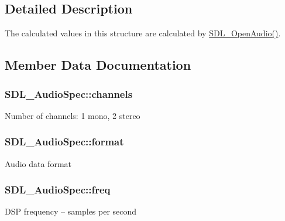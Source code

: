 \subsection{Detailed Description}
The calculated values in this structure are calculated by \hyperlink{_s_d_l__audio_8h_a2edf30e7747584e28041b4986f89f440}{S\+D\+L\+\_\+\+Open\+Audio()}. 

\subsection{Member Data Documentation}
\hypertarget{struct_s_d_l___audio_spec_a31fe8b3710cf23bbef24be8a1749fe46}{}
\subsubsection[{channels}]{ S\+D\+L\+\_\+\+Audio\+Spec\+::channels}\label{struct_s_d_l___audio_spec_a31fe8b3710cf23bbef24be8a1749fe46}
Number of channels\+: 1 mono, 2 stereo \hypertarget{struct_s_d_l___audio_spec_ae37c634cac5807762f184c8d5d49fc2d}{}
\subsubsection[{format}]{ S\+D\+L\+\_\+\+Audio\+Spec\+::format}\label{struct_s_d_l___audio_spec_ae37c634cac5807762f184c8d5d49fc2d}
Audio data format \hypertarget{struct_s_d_l___audio_spec_a8b823ce46fc2e448cf7e6fc141aff6b2}{}
\subsubsection[{freq}]{ S\+D\+L\+\_\+\+Audio\+Spec\+::freq}\label{struct_s_d_l___audio_spec_a8b823ce46fc2e448cf7e6fc141aff6b2}
D\+S\+P frequency -- samples per second \hypertarget{struct_s_d_l___audio_spec_a738371fc13b54cefef4db16994abeeb6}{}
